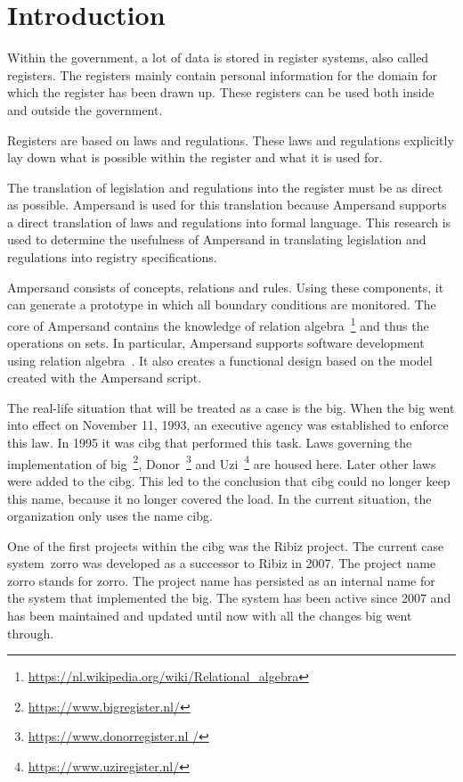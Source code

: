 \section{Introduction} \label{Introduction}

Within the government, a lot of data is stored in register systems, also called registers.
The registers mainly contain personal information for the domain for which the register has been drawn up.
These registers can be used both inside and outside the government.

Registers are based on laws and regulations.
These laws and regulations explicitly lay down what is possible within the register and what it is used for.

The translation of legislation and regulations into the register must be as direct as possible.
Ampersand is used for this translation because Ampersand supports a direct translation of laws and regulations into formal language.
This research is used to determine the usefulness of Ampersand in translating legislation and regulations into registry specifications.

Ampersand consists of concepts, relations and rules.
Using these components, it can generate a prototype in which all boundary conditions are monitored.
The core of Ampersand contains the knowledge of relation algebra~\footnote{\url{https://nl.wikipedia.org/wiki/Relational_algebra}} and thus the operations on sets.
In particular, Ampersand supports software development using relation algebra~\citep{joosten_software_2017}.
It also creates a functional design based on the model created with the Ampersand script.

The real-life situation that will be treated as a case is the \acrfull{big}.
When the \acrshort{big} went into effect on November 11, 1993, an executive agency was established to enforce this law.
In 1995 it was \acrfull{cibg} that performed this task.
Laws governing the implementation of \acrshort{big}~\footnote{\url{https://www.bigregister.nl/}}, Donor~\footnote{\url{https://www.donorregister.nl /} } and Uzi~\footnote{\url{https://www.uziregister.nl/}} are housed here.
Later other laws were added to the \acrshort{cibg}.
This led to the conclusion that \acrfull{cibg} could no longer keep this name, because it no longer covered the load.
In the current situation, the organization only uses the name \acrshort{cibg}.

One of the first projects within the \acrshort{cibg} was the Ribiz project.
The current case system~\acrshort{zorro} was developed as a successor to Ribiz in 2007.
The project name \acrshort{zorro} stands for \acrfull{zorro}.
The project name has persisted as an internal name for the system that implemented the \acrshort{big}.
The system has been active since 2007 and has been maintained and updated until now with all the changes \acrshort{big} went through.

